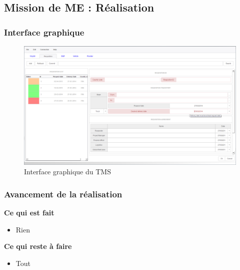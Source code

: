 \subsection{Mission de ME : Réalisation}
	\begin{frame}
		\frametitle{Interface graphique}
		\begin{figure}[htbp]
			\centering
			\includegraphics[scale=0.24]{Images/Interface}
			\caption{Interface graphique du TMS}
		\end{figure}
	\end{frame}
	\begin{frame}		
		\frametitle{Avancement de la réalisation}
		\begin{block}{\textbf{Ce qui est fait}}
			\begin{itemize}
				\item Rien
			\end{itemize}
		\end{block}
		\begin{block}{\textbf{Ce qui reste à faire}}
			\begin{itemize}
				\item Tout
			\end{itemize}
		\end{block}
	\end{frame}